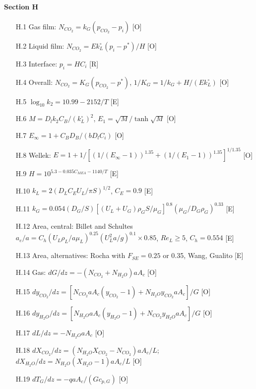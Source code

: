 \paragraph{Section H}
\begin{enumerate}[leftmargin=1.4cm,itemsep=0pt,topsep=2pt,parsep=0pt]\small
\item[H.1] Gas film: $N_{CO_2}=k_G(p_{CO_2}-p_i)$ {\footnotesize [O]}
\item[H.2] Liquid film: $N_{CO_2}=Ek_L^\circ(p_i-p^*)/H$ {\footnotesize [O]}
\item[H.3] Interface: $p_i=HC_i$ {\footnotesize [R]}
\item[H.4] Overall: $N_{CO_2}=K_G(p_{CO_2}-p^*)$, $1/K_G=1/k_G+H/(Ek_L^\circ)$ {\footnotesize [O]}
\item[H.5] $\log_{10}k_2=10.99-2152/T$ {\footnotesize [E]}
\item[H.6] $M=D_lk_2C_B/(k_L^\circ)^2$, $E_1=\sqrt M/\tanh\sqrt M$ {\footnotesize [O]}
\item[H.7] $E_\infty=1+C_BD_B/(bD_lC_i)$ {\footnotesize [O]}
\item[H.8] Wellek: $E=1+1/[(1/(E_\infty-1))^{1.35}+(1/(E_1-1))^{1.35}]^{1/1.35}$ {\footnotesize [O]}
\item[H.9] $H=10^{5.3-0.035C_{MEA}-1140/T}$ {\footnotesize [E]}
\item[H.10] $k_L=2(D_LC_EU_L/\pi S)^{1/2}$, $C_E=0.9$ {\footnotesize [E]}
\item[H.11] $k_G=0.054(D_G/S)[(U_L+U_G)\rho_GS/\mu_G]^{0.8}(\mu_G/D_G\rho_G)^{0.33}$ {\footnotesize [E]}
\item[H.12] Area, central: Billet and Schultes $a_e/a=C_h(U_L\rho_L/a\mu_L)^{0.25}(U_L^2a/g)^{0.1}\times0.85$, $Re_L\ge5$, $C_h=0.554$ {\footnotesize [E]}
\item[H.13] Area, alternatives: Rocha with $F_{SE}=0.25$ or 0.35, Wang, Gualito {\footnotesize [E]}
\item[H.14] Gas: $dG/dz=-(N_{CO_2}+N_{H_2O})aA_c$ {\footnotesize [O]}
\item[H.15] $dy_{CO_2}/dz=[N_{CO_2}aA_c(y_{CO_2}-1)+N_{H_2O}y_{CO_2}aA_c]/G$ {\footnotesize [O]}
\item[H.16] $dy_{H_2O}/dz=[N_{H_2O}aA_c(y_{H_2O}-1)+N_{CO_2}y_{H_2O}aA_c]/G$ {\footnotesize [O]}
\item[H.17] $dL/dz=-N_{H_2O}aA_c$ {\footnotesize [O]}
\item[H.18] $dX_{CO_2}/dz=(N_{H_2O}X_{CO_2}-N_{CO_2})aA_c/L$; $dX_{H_2O}/dz=N_{H_2O}(X_{H_2O}-1)aA_c/L$ {\footnotesize [O]}
\item[H.19] $dT_G/dz=-qaA_c/(Gc_{p,G})$ {\footnotesize [O]}

\end{enumerate}

